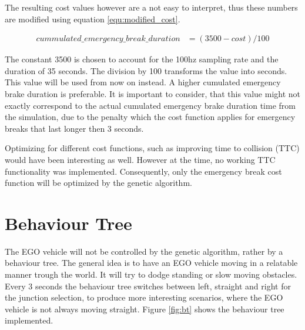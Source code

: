 The resulting cost values however are a not easy to interpret, thus these numbers are modified using equation \ref{equ:modified_cost}.

\begin{equation} 
	\label{equ:modified_cost}
	\begin{split}
		cummulated\_emergency\_break\_duration & = (3500 - cost) / 100
	\end{split}
\end{equation}

The constant 3500 is chosen to account for the 100hz sampling rate and the duration of 35 seconds. The division by 100 transforms the value into seconds. This value will be used from now on instead. A higher cumulated emergency brake duration is preferable. It is important to consider, that this value might not exactly correspond to the actual cumulated emergency brake duration time from the simulation, due to the penalty which the cost function applies for emergency breaks that last longer then 3 seconds.

Optimizing for different cost functions, such as improving time to collision (TTC) would have been interesting as well. However at the time, no working TTC functionality was implemented. Consequently, only the emergency break cost function will be optimized by the genetic algorithm.

\section{Behaviour Tree}
The EGO vehicle will not be controlled by the genetic algorithm, rather by a behaviour tree. The general idea is to have an EGO vehicle moving in a relatable manner trough the world. It will try to dodge standing or slow moving obstacles. Every 3 seconds the behaviour tree switches between left, straight and right for the junction selection, to produce more interesting scenarios, where the EGO vehicle is not always moving straight. Figure \ref{fig:bt} shows the behaviour tree implemented.

